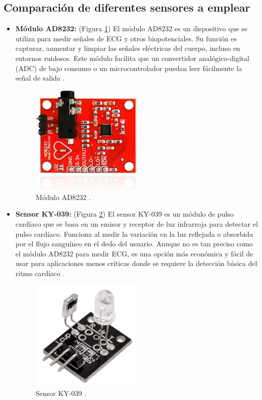 \subsection{Comparación de diferentes sensores a emplear}

\begin{itemize}
\item \textbf{Módulo AD8232:} (Figura \ref{fig:ad8232})
El módulo AD8232 es un dispositivo que se utiliza para medir señales de ECG y otros biopotenciales. Su función es capturar, aumentar y limpiar las señales eléctricas del cuerpo, incluso en entornos ruidosos. Este módulo facilita que un convertidor analógico-digital (ADC) de bajo consumo o un microcontrolador puedan leer fácilmente la señal de salida \cite{AD8232_teoria}.

\begin{figure}[h]
\centering
\includegraphics[width=0.5\textwidth]{img/ad8232.jpg}
\caption{Módulo AD8232 \cite{AD8232}.}
\label{fig:ad8232}
\end{figure}

\item \textbf{Sensor KY-039:} (Figura \ref{fig:ky039})
El sensor KY-039 es un módulo de pulso cardíaco que se basa en un emisor y receptor de luz infrarroja para detectar el pulso cardíaco. Funciona al medir la variación en la luz reflejada o absorbida por el flujo sanguíneo en el dedo del usuario. Aunque no es tan preciso como el módulo AD8232 para medir ECG, es una opción más económica y fácil de usar para aplicaciones menos críticas donde se requiere la detección básica del ritmo cardíaco \cite{KY039_teoria}.

\begin{figure}[h]
\centering
\includegraphics[width=0.5\textwidth]{img/ky-039.jpg}
\caption{Sensor KY-039 \cite{KY039}.}
\label{fig:ky039}
\end{figure}


\end{itemize}
